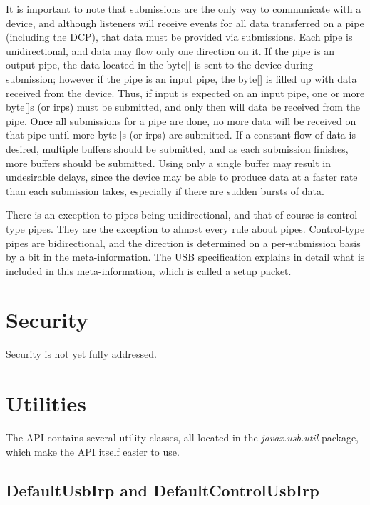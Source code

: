 \documentclass{article}
\newcommand{\mypackage}[1]{\emph{#1}}
\begin{document}
It is important to note that submissions are the only way to communicate
with a device, and although listeners will receive events for all data
transferred on a pipe (including the DCP), that data must be provided via
submissions.  Each pipe is unidirectional, and data may flow only one
direction on it.  If the pipe is an output pipe, the data located in the
byte[] is sent to the device during submission; however if the pipe
is an input pipe, the byte[] is filled up with data received from the device.
Thus, if input is expected on an input pipe, one or more byte[]s (or irps)
must be submitted, and only then will data be received from the pipe.
Once all submissions for a pipe are done, no more data will be received on
that pipe until more byte[]s (or irps) are submitted.  If a constant flow
of data is desired, multiple buffers should be submitted, and as each
submission finishes, more buffers should be submitted.  Using only
a single buffer may result in undesirable delays, since the device
may be able to produce data at a faster rate than each submission takes,
especially if there are sudden bursts of data.

There is an exception to pipes being unidirectional, and that of course is
control-type pipes.  They are the exception to almost every rule about pipes.
Control-type pipes are bidirectional, and the direction is determined on
a per-submission basis by a bit in the meta-information.  The USB
specification explains in detail what is included in this meta-information,
which is called a setup packet.

%

\section{Security}

Security is not yet fully addressed.

%

\section{Utilities}

The API contains several utility classes, all located in the \mypackage{javax.usb.util}
package, which make the API itself easier to use.

\subsection{DefaultUsbIrp and DefaultControlUsbIrp}
\end{document}

